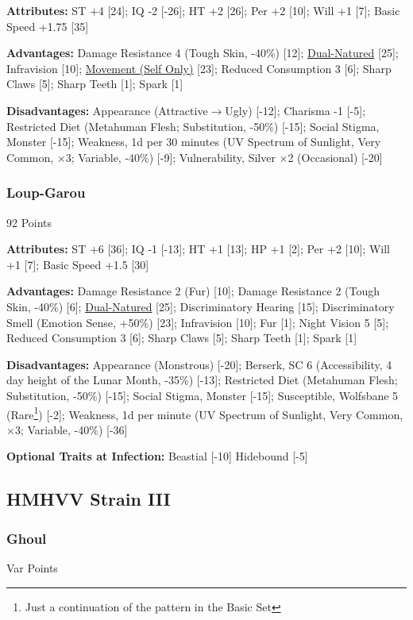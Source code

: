 \begin{multicols*}{3}
	\textbf{Attributes:}
	ST +4 [24]; IQ -2 [-26]; HT +2 [26]; Per +2 [10]; Will +1 [7]; Basic Speed +1.75 [35]
	
	\textbf{Advantages:}
	Damage Resistance 4 (Tough Skin, -40\%) [12]; \hyperref[dual_natured]{Dual-Natured} [25]; Infravision [10]; \hyperref[movement]{Movement (Self Only)} [23]; Reduced Consumption 3 [6]; Sharp Claws [5]; Sharp Teeth [1]; Spark [1]
	
	\textbf{Disadvantages:}
	Appearance (Attractive$\rightarrow$Ugly) [-12]; Charisma -1 [-5]; Restricted Diet (Metahuman Flesh; Substitution, -50\%) [-15]; Social Stigma, Monster [-15]; Weakness, 1d per 30 minutes (UV Spectrum of Sunlight, Very Common, $\times$3; Variable, -40\%) [-9]; Vulnerability, Silver ×2 (Occasional) [-20]
	
	\subsubsection{Loup-Garou}\label{loup-garou}
	\begin{flushright}
		92 Points
	\end{flushright}
	
	\textbf{Attributes:}
	ST +6 [36]; IQ -1 [-13]; HT +1 [13]; HP +1 [2]; Per +2 [10]; Will +1 [7]; Basic Speed +1.5 [30] 
	
	\textbf{Advantages:}
	Damage Resistance 2 (Fur) [10]; Damage Resistance 2 (Tough Skin, -40\%) [6]; \hyperref[dual_natured]{Dual-Natured} [25]; Discriminatory Hearing [15]; Discriminatory Smell (Emotion Sense, +50\%) [23]; Infravision [10]; Fur [1]; Night Vision 5 [5]; Reduced Consumption 3 [6]; Sharp Claws [5]; Sharp Teeth [1]; Spark [1]
	
	\textbf{Disadvantages:}
	Appearance (Monstrous) [-20]; Berserk, SC 6 (Accessibility, 4 day height of the Lunar Month, -35\%) [-13]; Restricted Diet (Metahuman Flesh; Substitution, -50\%) [-15]; Social Stigma, Monster [-15]; Susceptible, Wolfsbane 5 (Rare\footnote{Just a continuation of the pattern in the Basic Set}) [-2]; Weakness, 1d per minute (UV Spectrum of Sunlight, Very Common, $\times$3; Variable, -40\%) [-36]
	
	\textbf{Optional Traits at Infection:}
	Beastial [-10]
	Hidebound [-5]	
	
	\subsection*{HMHVV Strain III}
		
	\subsubsection{Ghoul}\label{ghoul}
	\begin{flushright}
		Var Points
	\end{flushright}


\end{multicols*}
